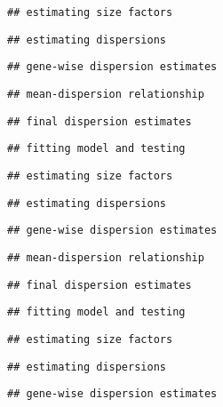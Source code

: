 \documentclass[
]{article}
\begin{document}
\begin{verbatim}
## estimating size factors
\end{verbatim}

\begin{verbatim}
## estimating dispersions
\end{verbatim}

\begin{verbatim}
## gene-wise dispersion estimates
\end{verbatim}

\begin{verbatim}
## mean-dispersion relationship
\end{verbatim}

\begin{verbatim}
## final dispersion estimates
\end{verbatim}

\begin{verbatim}
## fitting model and testing
\end{verbatim}

\begin{verbatim}
## estimating size factors
\end{verbatim}

\begin{verbatim}
## estimating dispersions
\end{verbatim}

\begin{verbatim}
## gene-wise dispersion estimates
\end{verbatim}

\begin{verbatim}
## mean-dispersion relationship
\end{verbatim}

\begin{verbatim}
## final dispersion estimates
\end{verbatim}

\begin{verbatim}
## fitting model and testing
\end{verbatim}

\begin{verbatim}
## estimating size factors
\end{verbatim}

\begin{verbatim}
## estimating dispersions
\end{verbatim}

\begin{verbatim}
## gene-wise dispersion estimates
\end{verbatim}
\end{document}
